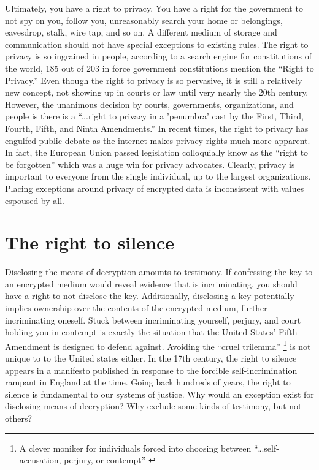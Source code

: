 \documentclass[format=sigconf]{acmart}
\begin{document}
Ultimately, you have a right to privacy. You have a right for the government to not spy on you, follow you, unreasonably search your home or belongings, eavesdrop, stalk, wire tap, and so on. A different medium of storage and communication should not have special exceptions to existing rules. The right to privacy is so ingrained in people, according to a search engine for constitutions of the world, 185 out of 203 in force government constitutions mention the ``Right to Privacy.'' \cite{constitue} Even though the right to privacy is so pervasive, it is still a relatively new concept, not showing up in courts or law until very nearly the 20th century. \cite{haydel} However, the unanimous decision by courts, governments, organizations, and people is there is a ``...right to privacy in a 'penumbra' cast by the First, Third, Fourth, Fifth, and Ninth Amendments.'' \cite{haydel} In recent times, the right to privacy has engulfed public debate as the internet makes privacy rights much more apparent. In fact, the European Union passed legislation colloquially know as the ``right to be forgotten'' which was a huge win for privacy advocates. \cite{gdpr} Clearly, privacy is important to everyone from the single individual, up to the largest organizations. Placing exceptions around privacy of encrypted data is inconsistent with values espoused by all.

\section{The right to silence}

Disclosing the means of decryption amounts to testimony. If confessing the key to an encrypted medium would reveal evidence that is incriminating, you should have a right to not disclose the key. Additionally, disclosing a key potentially implies ownership over the contents of the encrypted medium, further incriminating oneself. Stuck between incriminating yourself, perjury, and court holding you in contempt is exactly the situation that the United States' Fifth Amendment is designed to defend against. Avoiding the ``cruel trilemma'' \footnote{A clever moniker for individuals forced into choosing between ``...self-accusation, perjury, or contempt'' \cite{crueltri}} is not unique to to the United states either. In the 17th century, the right to silence appears in a manifesto published in response to the forcible self-incrimination rampant in England at the time. \cite{agreement} Going back hundreds of years, the right to silence is fundamental to our systems of justice. Why would an exception exist for disclosing means of decryption? Why exclude some kinds of testimony, but not others?  
\end{document}

